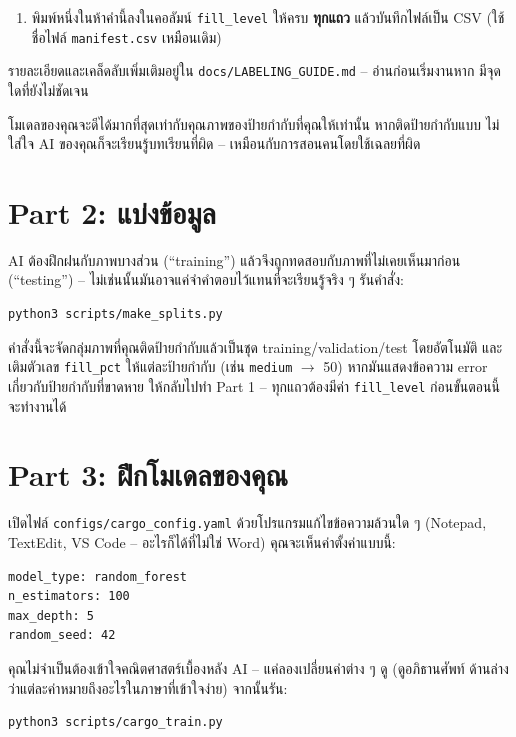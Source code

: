 \documentclass[11pt]{article}
\begin{document}
\begin{enumerate}[resume]
  \item พิมพ์หนึ่งในห้าคำนี้ลงในคอลัมน์ \texttt{fill\_level} ให้ครบ \textbf{ทุกแถว} แล้วบันทึกไฟล์เป็น CSV (ใช้ชื่อไฟล์ \texttt{manifest.csv} เหมือนเดิม)
\end{enumerate}

รายละเอียดและเคล็ดลับเพิ่มเติมอยู่ใน \texttt{docs/LABELING\_GUIDE.md} -- อ่านก่อนเริ่มงานหาก
มีจุดใดที่ยังไม่ชัดเจน

\begin{tipbox}
โมเดลของคุณจะดีได้มากที่สุดเท่ากับคุณภาพของป้ายกำกับที่คุณให้เท่านั้น หากติดป้ายกำกับแบบ
ไม่ใส่ใจ AI ของคุณก็จะเรียนรู้บทเรียนที่ผิด -- เหมือนกับการสอนคนโดยใช้เฉลยที่ผิด
\end{tipbox}

\section*{Part 2: แบ่งข้อมูล}
AI ต้องฝึกฝนกับภาพบางส่วน (``training'') แล้วจึงถูกทดสอบกับภาพที่ไม่เคยเห็นมาก่อน
(``testing'') -- ไม่เช่นนั้นมันอาจแค่จำคำตอบไว้แทนที่จะเรียนรู้จริง ๆ รันคำสั่ง:

\begin{lstlisting}
python3 scripts/make_splits.py
\end{lstlisting}

คำสั่งนี้จะจัดกลุ่มภาพที่คุณติดป้ายกำกับแล้วเป็นชุด training/validation/test โดยอัตโนมัติ
และเติมตัวเลข \texttt{fill\_pct} ให้แต่ละป้ายกำกับ (เช่น \texttt{medium} $\rightarrow$ 50)
หากมันแสดงข้อความ error เกี่ยวกับป้ายกำกับที่ขาดหาย ให้กลับไปทำ Part 1 -- ทุกแถวต้องมีค่า
\texttt{fill\_level} ก่อนขั้นตอนนี้จะทำงานได้

\section*{Part 3: ฝึกโมเดลของคุณ}
เปิดไฟล์ \texttt{configs/cargo\_config.yaml} ด้วยโปรแกรมแก้ไขข้อความล้วนใด ๆ (Notepad,
TextEdit, VS Code -- อะไรก็ได้ที่ไม่ใช่ Word) คุณจะเห็นค่าตั้งค่าแบบนี้:

\begin{lstlisting}
model_type: random_forest
n_estimators: 100
max_depth: 5
random_seed: 42
\end{lstlisting}

คุณไม่จำเป็นต้องเข้าใจคณิตศาสตร์เบื้องหลัง AI -- แค่ลองเปลี่ยนค่าต่าง ๆ ดู (ดูอภิธานศัพท์
ด้านล่างว่าแต่ละค่าหมายถึงอะไรในภาษาที่เข้าใจง่าย) จากนั้นรัน:

\begin{lstlisting}
python3 scripts/cargo_train.py
\end{lstlisting}
\end{document}
